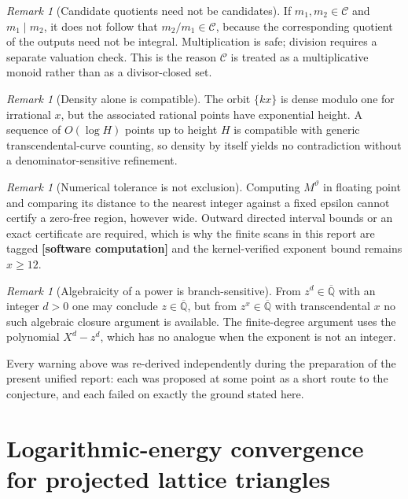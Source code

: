 \documentclass[11pt,oneside]{article}
\theoremstyle{definition}
\theoremstyle{remark}
\newtheorem{remark}[theorem]{Remark}
\newcommand{\Abar}{\overline{\mathbb Q}}
\newcommand{\thetaq}{\vartheta}
\newcommand{\Cand}{\mathcal C}
\newcommand{\Qbar}{\Abar}
\newcommand{\statuscomp}{\textcolor{computeviolet}{\textbf{[software computation]}}}
\begin{document}
\begin{remark}[Candidate quotients need not be candidates]
\label{a4:warn-quotient}
If $m_1,m_2\in\Cand$ and $m_1\mid m_2$, it does not follow that $m_2/m_1\in\Cand$, because
the corresponding quotient of the outputs need not be integral.  Multiplication is safe;
division requires a separate valuation check.  This is the reason $\Cand$ is treated as a
multiplicative monoid rather than as a divisor-closed set.
\end{remark}

\begin{remark}[Density alone is compatible]
\label{a4:warn-density}
The orbit $\{kx\}$ is dense modulo one for irrational $x$, but the associated rational points
have exponential height.  A sequence of $O(\log H)$ points up to height $H$ is compatible
with generic transcendental-curve counting, so density by itself yields no contradiction
without a denominator-sensitive refinement.
\end{remark}

\begin{remark}[Numerical tolerance is not exclusion]
\label{a4:warn-tolerance}
Computing $M^{\thetaq}$ in floating point and comparing its distance to the nearest integer
against a fixed epsilon cannot certify a zero-free region, however wide.  Outward directed
interval bounds or an exact certificate are required, which is why the finite scans in this
report are tagged \statuscomp{} and the kernel-verified exponent bound remains $x\ge12$.
\end{remark}

\begin{remark}[Algebraicity of a power is branch-sensitive]
\label{a4:warn-branch}
From $z^{d}\in\Qbar$ with an integer $d>0$ one may conclude $z\in\Qbar$, but from
$z^{x}\in\Qbar$ with transcendental $x$ no such algebraic closure argument is available.  The
finite-degree argument uses the polynomial $X^{d}-z^{d}$, which has no analogue when the
exponent is not an integer.
\end{remark}

Every warning above was re-derived independently during the preparation of the present
unified report: each was proposed at some point as a short route to the conjecture, and each
failed on exactly the ground stated here.



\section{Logarithmic-energy convergence for projected lattice triangles}
\label{app:energy-convergence}
\end{document}
